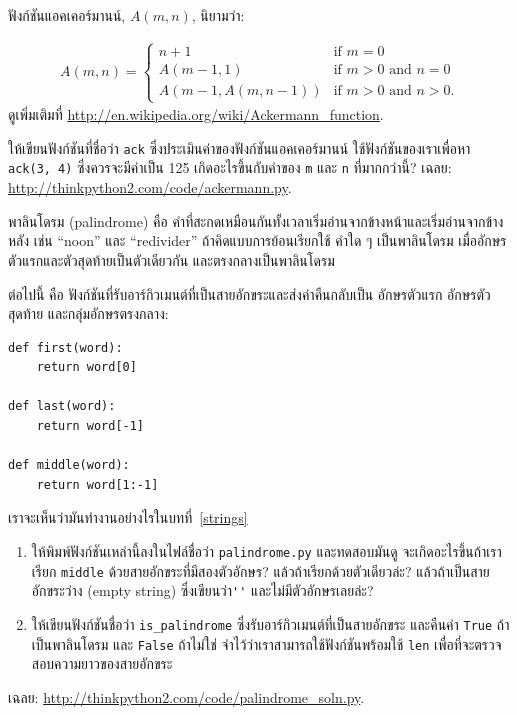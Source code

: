 \begin{exercise}
\label{ackermann}

ฟังก์ชันแอคเคอร์มานน์, {\scriptsize$A(m, n)$}, นิยามว่า:

\begin{eqnarray*}
A(m, n) = \begin{cases} 
              n+1 & \mbox{if } m = 0 \\ 
        A(m-1, 1) & \mbox{if } m > 0 \mbox{ and } n = 0 \\ 
A(m-1, A(m, n-1)) & \mbox{if } m > 0 \mbox{ and } n > 0.
\end{cases} 
\end{eqnarray*}
%
ดูเพิ่มเติมที่ \url{http://en.wikipedia.org/wiki/Ackermann_function}.

ให้เขียนฟังก์ชันที่ชื่อว่า {\tt ack} ซึ่งประเมินค่าของฟังก์ชันแอคเคอร์มานน์ ใช้ฟังก์ชันของเราเพื่อหา
{\tt ack(3, 4)} ซึ่งควรจะมีค่าเป็น 125  เกิดอะไรขึ้นกับค่าของ {\tt m} และ {\tt n} ที่มากกว่านี้?
เฉลย: \url{http://thinkpython2.com/code/ackermann.py}.

\end{exercise}


\begin{exercise}
\label{palindrome}

พาลินโดรม (palindrome) คือ คำที่สะกดเหมือนกันทั้งเวลาเริ่มอ่านจากข้างหน้าและเริ่มอ่านจากข้างหลัง
เช่น ``noon'' และ ``redivider''  ถ้าคิดแบบการย้อนเรียกใช้ คำใด ๆ เป็นพาลินโดรม เมื่ออักษรตัวแรกและตัวสุดท้ายเป็นตัวเดียวกัน และตรงกลางเป็นพาลินโดรม

ต่อไปนี้ คือ ฟังก์ชันที่รับอาร์กิวเมนต์ที่เป็นสายอักขระและส่งค่าคืนกลับเป็น อักษรตัวแรก อักษรตัวสุดท้าย และกลุ่มอักษรตรงกลาง:

\begin{verbatim}
def first(word):
    return word[0]

def last(word):
    return word[-1]

def middle(word):
    return word[1:-1]
\end{verbatim}
%
เราจะเห็นว่ามันทำงานอย่างไรในบทที่~\ref{strings}

\begin{enumerate}

\item ให้พิมพ์ฟังก์ชันเหล่านี้ลงในไฟล์ชื่อว่า {\tt palindrome.py} และทดสอบมันดู
จะเกิดอะไรขึ้นถ้าเราเรียก {\tt middle} ด้วยสายอักขระที่มีสองตัวอักษร? แล้วถ้าเรียกด้วยตัวเดียวล่ะ?
แล้วถ้าเป็นสายอักขระว่าง (empty string) ซึ่งเขียนว่า\verb"''" และไม่มีตัวอักษรเลยล่ะ?

\item ให้เขียนฟังก์ชันชื่อว่า \verb"is_palindrome" ซึ่งรับอาร์กิวเมนต์ที่เป็นสายอักขระ และคืนค่า {\tt True} 
ถ้าเป็นพาลินโดรม และ {\tt False} ถ้าไม่ใช่  จำไว้ว่าเราสามารถใช้ฟังก์ชันพร้อมใช้ {\tt len} 
เพื่อที่จะตรวจสอบความยาวของสายอักขระ

\end{enumerate}

เฉลย: \url{http://thinkpython2.com/code/palindrome_soln.py}.

\end{exercise}

